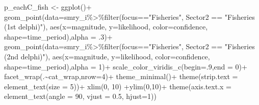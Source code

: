 \documentclass[
]{article}
\newenvironment{Shaded}{\begin{snugshade}}{\end{snugshade}}
\newcommand{\AttributeTok}[1]{\textcolor[rgb]{0.77,0.63,0.00}{#1}}
\newcommand{\DecValTok}[1]{\textcolor[rgb]{0.00,0.00,0.81}{#1}}
\newcommand{\FloatTok}[1]{\textcolor[rgb]{0.00,0.00,0.81}{#1}}
\newcommand{\FunctionTok}[1]{\textcolor[rgb]{0.00,0.00,0.00}{#1}}
\newcommand{\NormalTok}[1]{#1}
\newcommand{\OtherTok}[1]{\textcolor[rgb]{0.56,0.35,0.01}{#1}}
\newcommand{\SpecialCharTok}[1]{\textcolor[rgb]{0.00,0.00,0.00}{#1}}
\newcommand{\StringTok}[1]{\textcolor[rgb]{0.31,0.60,0.02}{#1}}
\begin{document}
\begin{Shaded}
\begin{Highlighting}[]
\NormalTok{p\_eachC\_fish }\OtherTok{\textless{}{-}} \FunctionTok{ggplot}\NormalTok{()}\SpecialCharTok{+}
  \FunctionTok{geom\_point}\NormalTok{(}\AttributeTok{data=}\NormalTok{smry\_i}\SpecialCharTok{\%\textgreater{}\%}\FunctionTok{filter}\NormalTok{(focus}\SpecialCharTok{==}\StringTok{"Fisheries"}\NormalTok{, Sector2 }\SpecialCharTok{==} \StringTok{"Fisheries (1st delphi)"}\NormalTok{),}
                                  \FunctionTok{aes}\NormalTok{(}\AttributeTok{x=}\NormalTok{magnitude,}
                                      \AttributeTok{y=}\NormalTok{likelihood,}
                                      \AttributeTok{color=}\NormalTok{confidence,}
                                      \AttributeTok{shape=}\NormalTok{time\_period),}\AttributeTok{alpha =}\NormalTok{ .}\DecValTok{3}\NormalTok{)}\SpecialCharTok{+}
  \FunctionTok{geom\_point}\NormalTok{(}\AttributeTok{data=}\NormalTok{smry\_i}\SpecialCharTok{\%\textgreater{}\%}\FunctionTok{filter}\NormalTok{(focus}\SpecialCharTok{==}\StringTok{"Fisheries"}\NormalTok{, Sector2 }\SpecialCharTok{==} \StringTok{"Fisheries (2nd delphi)"}\NormalTok{),}
                                  \FunctionTok{aes}\NormalTok{(}\AttributeTok{x=}\NormalTok{magnitude,}
                                      \AttributeTok{y=}\NormalTok{likelihood,}
                                      \AttributeTok{color=}\NormalTok{confidence,}
                                      \AttributeTok{shape=}\NormalTok{time\_period),}\AttributeTok{alpha =} \DecValTok{1}\NormalTok{)}\SpecialCharTok{+}
  \FunctionTok{scale\_color\_viridis\_c}\NormalTok{(}\AttributeTok{begin=}\NormalTok{.}\DecValTok{9}\NormalTok{,}\AttributeTok{end =} \DecValTok{0}\NormalTok{)}\SpecialCharTok{+}
  \FunctionTok{facet\_wrap}\NormalTok{(.}\SpecialCharTok{\textasciitilde{}}\NormalTok{cat\_wrap,}\AttributeTok{nrow=}\DecValTok{4}\NormalTok{)}\SpecialCharTok{+}
  \FunctionTok{theme\_minimal}\NormalTok{()}\SpecialCharTok{+} 
  \FunctionTok{theme}\NormalTok{(}\AttributeTok{strip.text =} \FunctionTok{element\_text}\NormalTok{(}\AttributeTok{size =} \DecValTok{5}\NormalTok{))}\SpecialCharTok{+}
  \FunctionTok{xlim}\NormalTok{(}\DecValTok{0}\NormalTok{, }\DecValTok{10}\NormalTok{) }\SpecialCharTok{+}\FunctionTok{ylim}\NormalTok{(}\DecValTok{0}\NormalTok{,}\DecValTok{10}\NormalTok{)}\SpecialCharTok{+} 
  \FunctionTok{theme}\NormalTok{(}\AttributeTok{axis.text.x =} \FunctionTok{element\_text}\NormalTok{(}\AttributeTok{angle =} \DecValTok{90}\NormalTok{, }\AttributeTok{vjust =} \FloatTok{0.5}\NormalTok{, }\AttributeTok{hjust=}\DecValTok{1}\NormalTok{))}


\end{Highlighting}
\end{Shaded}
\end{document}
